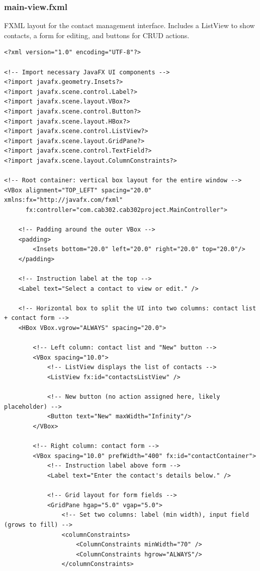 \documentclass{article}
\begin{document}
\subsubsection*{main-view.fxml}
FXML layout for the contact management interface. Includes a ListView to show contacts, a form for editing, and buttons for CRUD actions.

\begin{verbatim}
<?xml version="1.0" encoding="UTF-8"?>

<!-- Import necessary JavaFX UI components -->
<?import javafx.geometry.Insets?>
<?import javafx.scene.control.Label?>
<?import javafx.scene.layout.VBox?>
<?import javafx.scene.control.Button?>
<?import javafx.scene.layout.HBox?>
<?import javafx.scene.control.ListView?>
<?import javafx.scene.layout.GridPane?>
<?import javafx.scene.control.TextField?>
<?import javafx.scene.layout.ColumnConstraints?>

<!-- Root container: vertical box layout for the entire window -->
<VBox alignment="TOP_LEFT" spacing="20.0" xmlns:fx="http://javafx.com/fxml"
      fx:controller="com.cab302.cab302project.MainController">

    <!-- Padding around the outer VBox -->
    <padding>
        <Insets bottom="20.0" left="20.0" right="20.0" top="20.0"/>
    </padding>

    <!-- Instruction label at the top -->
    <Label text="Select a contact to view or edit." />

    <!-- Horizontal box to split the UI into two columns: contact list + contact form -->
    <HBox VBox.vgrow="ALWAYS" spacing="20.0">

        <!-- Left column: contact list and "New" button -->
        <VBox spacing="10.0">
            <!-- ListView displays the list of contacts -->
            <ListView fx:id="contactsListView" />

            <!-- New button (no action assigned here, likely placeholder) -->
            <Button text="New" maxWidth="Infinity"/>
        </VBox>

        <!-- Right column: contact form -->
        <VBox spacing="10.0" prefWidth="400" fx:id="contactContainer">
            <!-- Instruction label above form -->
            <Label text="Enter the contact's details below." />

            <!-- Grid layout for form fields -->
            <GridPane hgap="5.0" vgap="5.0">
                <!-- Set two columns: label (min width), input field (grows to fill) -->
                <columnConstraints>
                    <ColumnConstraints minWidth="70" />
                    <ColumnConstraints hgrow="ALWAYS"/>
                </columnConstraints>


\end{verbatim}
\end{document}
